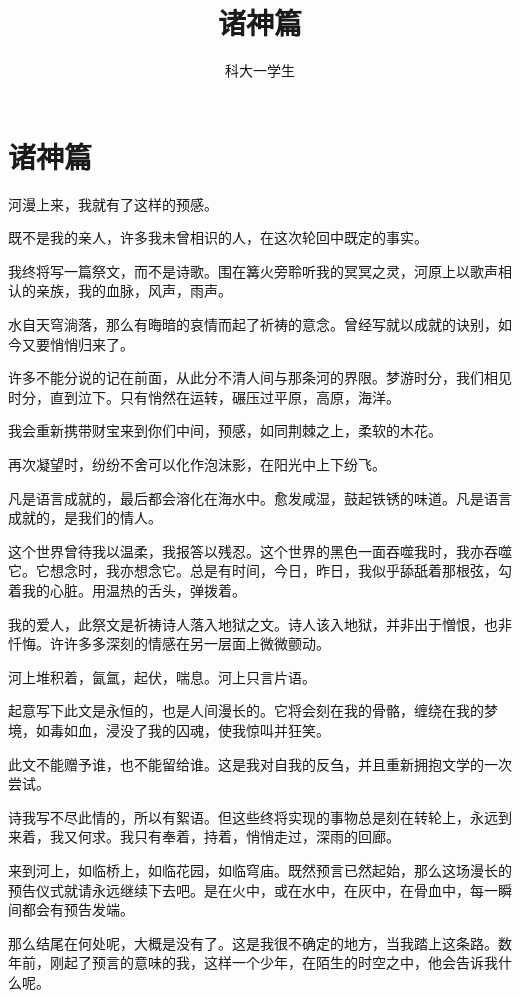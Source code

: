 \documentclass[UTF8]{article}
\title{诸神篇}
\author{科大一学生}
\date{}
\begin{document}
\maketitle
\section{诸神篇}
\par 河漫上来，我就有了这样的预感。
\par 既不是我的亲人，许多我未曾相识的人，在这次轮回中既定的事实。
\par 我终将写一篇祭文，而不是诗歌。围在篝火旁聆听我的冥冥之灵，河原上以歌声相认的亲族，我的血脉，风声，雨声。
\par 水自天穹淌落，那么有晦暗的哀情而起了祈祷的意念。曾经写就以成就的诀别，如今又要悄悄归来了。
\par 许多不能分说的记在前面，从此分不清人间与那条河的界限。梦游时分，我们相见时分，直到泣下。只有悄然在运转，碾压过平原，高原，海洋。
\par 我会重新携带财宝来到你们中间，预感，如同荆棘之上，柔软的木花。
\\[0.6cm]
\par 再次凝望时，纷纷不舍可以化作泡沫影，在阳光中上下纷飞。
\par 凡是语言成就的，最后都会溶化在海水中。愈发咸湿，鼓起铁锈的味道。凡是语言成就的，是我们的情人。
\par 这个世界曾待我以温柔，我报答以残忍。这个世界的黑色一面吞噬我时，我亦吞噬它。它想念时，我亦想念它。总是有时间，今日，昨日，我似乎舔舐着那根弦，勾着我的心脏。用温热的舌头，弹拨着。
\par 我的爱人，此祭文是祈祷诗人落入地狱之文。诗人该入地狱，并非出于憎恨，也非忏悔。许许多多深刻的情感在另一层面上微微颤动。
\\[0.6cm]
\par 河上堆积着，氤氲，起伏，喘息。河上只言片语。
\par 起意写下此文是永恒的，也是人间漫长的。它将会刻在我的骨骼，缠绕在我的梦境，如毒如血，浸没了我的囚魂，使我惊叫并狂笑。
\par 此文不能赠予谁，也不能留给谁。这是我对自我的反刍，并且重新拥抱文学的一次尝试。
\par 诗我写不尽此情的，所以有絮语。但这些终将实现的事物总是刻在转轮上，永远到来着，我又何求。我只有奉着，持着，悄悄走过，深雨的回廊。
\par 来到河上，如临桥上，如临花园，如临穹庙。既然预言已然起始，那么这场漫长的预告仪式就请永远继续下去吧。是在火中，或在水中，在灰中，在骨血中，每一瞬间都会有预告发端。
\par 那么结尾在何处呢，大概是没有了。这是我很不确定的地方，当我踏上这条路。数年前，刚起了预言的意味的我，这样一个少年，在陌生的时空之中，他会告诉我什么呢。
\end{document}
